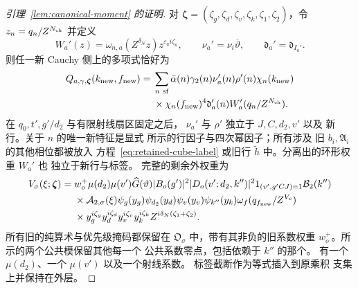 \documentclass[11pt,a4paper]{article}
\numberwithin{equation}{section}
\numberwithin{figure}{section}
\theoremstyle{definition}
\theoremstyle{remark}
\begin{document}
\begin{proof}[引理~\ref{lem:canonical-moment} 的证明]
对 \(\boldsymbol\zeta=(\zeta_g,\zeta_d,\zeta_v,\zeta_k,
\zeta_1,\zeta_2)\)，令 \(z_n=q_n/Z^{N_{\rm ch}}\) 并定义
\[
 W_a'(z)=\omega_{n,a}(Z^{\delta_N}z)z^{\varepsilon_a i\zeta_a},
 \qquad \nu_a'=\nu_i\overline\vartheta,\qquad
 \mathfrak d_a'=\mathfrak d_{I_a'}.
\]
则任一新 Cauchy 侧上的多项式恰好为
\begin{equation}\label{eq:canonical-child-polynomial}
 \begin{split}
 Q_{a,\gamma,\boldsymbol\zeta}(k_{\rm new},f_{\rm new})={}&
 \sum_{n\ {\rm sf}}\bar\alpha(n)\gamma_2(n)\nu_a'(n)\rho'(n)
 \chi_n(k_{\rm new})\\
 &\times\chi_n(f_{\rm new})^4
 \mathfrak d_a'(n)W_a'(q_n/Z^{N_{\rm ch}}).
 \end{split}
\end{equation}
在 \(q_0,t',g'/d_2\) 与有限射线扇区固定之后，
\(\nu_a'\) 与 \(\rho'\) 独立于 \(J,C,d_2,v'\) 以及
新行。关于 \(n\) 的唯一新特征是显式
所示的行因子与四次幂因子；所有涉及
旧 \(b_i,\mathfrak A_i\) 的其他相位都被放入
方程~\eqref{eq:retained-cube-label} 或旧行
\(\widetilde h\) 中。分离出的环形权重 \(W_a'\) 也
独立于新行与标签。
完整的剩余外权重为
\begin{equation}\label{eq:inverse-second-outer-weight}
 \begin{split}
 V_\sigma(\xi;\boldsymbol\zeta)={}&w_o^+\mu(d_2)\mu(v')\widehat G(\vartheta)
 |B_o(g')|^2|D_o(v';d_2,k'')|^2
 1_{(v',g'CJ)=1}\mathcal B_2(k'')\\
 &\times\mathcal A_{2,\sigma}(\xi)
 \psi_g(y_g)\psi_{d_2}(y_d)\psi_v(y_v)\psi_{k''}(y_k)
 \omega_f(q_{f_{\rm new}}/Z^{V_c})\\
 &\times y_g^{i\zeta_g}y_d^{i\zeta_d}y_v^{i\zeta_v}y_k^{i\zeta_k}
       Z^{i\delta_N(\zeta_1+\zeta_2)}.
 \end{split}
\end{equation}
所有旧的纯算术与优先级掩码都保留在
\(\mathfrak O_\sigma\) 中，带有其非负的旧系数权重
\(w_o^+\)。所示的两个公共模保留其他每一个
公共系数零点，包括依赖于 \(k''\) 的那个。
有一个 \(\mu(d_2)\)、一个 \(\mu(v')\) 以及一个射线系数。
标签截断作为等式插入到原乘积
支集上并保持在外层。


\end{proof}
\end{document}
